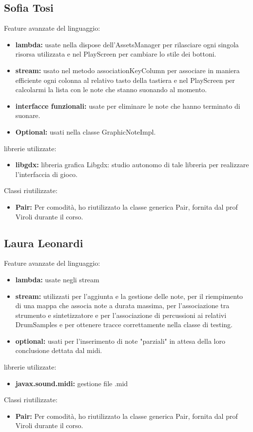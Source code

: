 \documentclass[a4paper,12pt]{report}
\begin{document}
\subsection{Sofia Tosi}
Feature avanzate del linguaggio:
\begin{itemize}
	\item \textbf{lambda:} usate nella dispose dell'AssetsManager per rilasciare ogni singola risorsa utilizzata e nel PlayScreen per cambiare lo stile dei bottoni.
	\item \textbf{stream:} usato nel metodo associationKeyColumn per associare in maniera efficiente ogni colonna al relativo tasto della tastiera e nel PlayScreen per calcolarmi la lista con le note che stanno suonando al momento.
	\item \textbf{interfacce funzionali:} usate per eliminare le note che hanno terminato di suonare.
	\item \textbf{Optional:} usati nella classe GraphicNoteImpl.
\end{itemize}
librerie utilizzate:
\begin{itemize}
	\item \textbf{libgdx:} libreria grafica Libgdx: studio autonomo di tale libreria per realizzare l'interfaccia di gioco.
\end{itemize}
 Classi riutilizzate:
\begin{itemize}
	\item \textbf{Pair:} Per comodità, ho riutilizzato la classe generica Pair, fornita dal prof Viroli durante il corso. 
\end{itemize}
\newpage

\subsection{Laura Leonardi}
Feature avanzate del linguaggio:
\begin{itemize}
	\item \textbf{lambda:} usate negli stream
	\item \textbf{stream:} utilizzati per l'aggiunta e la gestione delle note, per il riempimento di una mappa che associa note a durata massima, per l'associazione tra strumento e sintetizzatore e per l'associazione di percussioni ai relativi DrumSamples e per ottenere tracce correttamente nella classe di testing.
	\item \textbf{optional:} usati per l'inserimento di note "parziali" in attesa della loro conclusione dettata dal midi.
\end{itemize}
librerie utilizzate:
\begin{itemize}
	\item \textbf{javax.sound.midi:} gestione file .mid
\end{itemize}
 Classi riutilizzate:
\begin{itemize}
	\item \textbf{Pair:} Per comodità, ho riutilizzato la classe generica Pair, fornita dal prof Viroli durante il corso. 
\end{itemize}
\newpage
\end{document}
